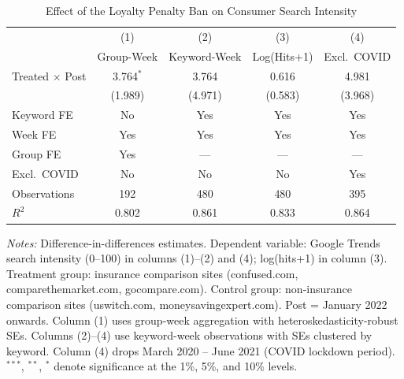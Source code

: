\begin{table}[htbp]
\centering
\caption{Effect of the Loyalty Penalty Ban on Consumer Search Intensity}
\label{tab:main_did}
\begin{threeparttable}
\begin{tabular}{lcccc}
\toprule
 & (1) & (2) & (3) & (4) \\
 & Group-Week & Keyword-Week & Log(Hits+1) & Excl.\ COVID \\
\midrule
Treated $\times$ Post & 3.764$^{*}$ & 3.764 & 0.616 & 4.981 \\
 & (1.989) & (4.971) & (0.583) & (3.968) \\
\midrule
Keyword FE & No & Yes & Yes & Yes \\
Week FE & Yes & Yes & Yes & Yes \\
Group FE & Yes & --- & --- & --- \\
Excl.\ COVID & No & No & No & Yes \\
Observations & 192 & 480 & 480 & 395 \\
$R^2$ & 0.802 & 0.861 & 0.833 & 0.864 \\
\bottomrule
\end{tabular}
\begin{tablenotes}[flushleft]
\small
\item \textit{Notes:} Difference-in-differences estimates. Dependent variable: Google Trends search intensity (0--100) in columns (1)--(2) and (4); log(hits+1) in column (3). Treatment group: insurance comparison sites (confused.com, comparethemarket.com, gocompare.com). Control group: non-insurance comparison sites (uswitch.com, moneysavingexpert.com). Post = January 2022 onwards. Column (1) uses group-week aggregation with heteroskedasticity-robust SEs. Columns (2)--(4) use keyword-week observations with SEs clustered by keyword. Column (4) drops March 2020 -- June 2021 (COVID lockdown period). $^{***}$, $^{**}$, $^{*}$ denote significance at the 1\%, 5\%, and 10\% levels.
\end{tablenotes}
\end{threeparttable}
\end{table}
